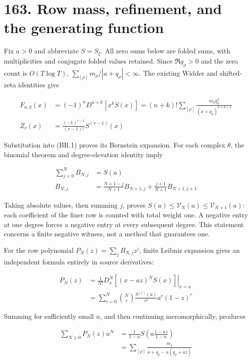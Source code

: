 \documentclass[
  11pt,
]{book}
\begin{document}
\section{163. Row mass, refinement, and the generating
function}\label{row-mass-refinement-and-the-generating-function}

Fix \(a>0\) and abbreviate \(S=S_\xi\). All zero sums below are folded
sums, with multiplicities and conjugate folded values retained. Since
\(\Re q_\rho>0\) and the zero count is \(O(T\log T)\),
\(\sum_{[\rho]}m_\rho/|a+q_\rho|<\infty\). The existing Widder and
shifted-zeta identities give

\[
\begin{aligned}
F_{n,k}(x)&=(-1)^nD^{n+k}[x^kS(x)]
=(n+k)!\sum_{[\rho]}\frac{m_\rho q_\rho^k}{(x+q_\rho)^{n+k+1}}\\
Z_r(x)&=\frac{(-1)^{r-1}}{(r-1)!}S^{(r-1)}(x)
\end{aligned}
\tag{163.1}
\]

Substitution into (BR.1) proves its Bernstein expansion. For each
complex \(\theta\), the binomial theorem and degree-elevation identity
imply

\[
\begin{aligned}
\sum_{j=0}^NB_{N,j}&=S(a)\\
B_{N,j}&=\frac{N+1-j}{N+1}B_{N+1,j}
+\frac{j+1}{N+1}B_{N+1,j+1}
\end{aligned}
\tag{163.2}
\]

Taking absolute values, then summing \(j\), proves
\(S(a)\le\mathcal V_N(a)\le\mathcal V_{N+1}(a)\): each coefficient of
the finer row is counted with total weight one. A negative entry at one
degree forces a negative entry at every subsequent degree. This
statement concerns a finite negative witness, not a method that
guarantees one.

For the row polynomial \(P_N(z)=\sum_jB_{N,j}z^j\), finite Leibniz
expansion gives an independent formula entirely in source derivatives:

\[
\begin{aligned}
P_N(z)&=\left.\frac1{N!}D_x^N[(x-az)^NS(x)]\right|_{x=a}\\
&=\sum_{r=0}^N\binom Nr\frac{S^{(r)}(a)}{r!}
a^r(1-z)^r
\end{aligned}
\tag{163.3}
\]

Summing for sufficiently small \(u\), and then continuing
meromorphically, produces

\[
\begin{aligned}
\sum_{N\ge0}P_N(z)u^N
&=\frac1{1-u}S\!\left(a\frac{1-uz}{1-u}\right)\\
&=\sum_{[\rho]}\frac{m_\rho}{a+q_\rho-u(q_\rho+az)}
\end{aligned}
\tag{163.4}
\]
\end{document}
